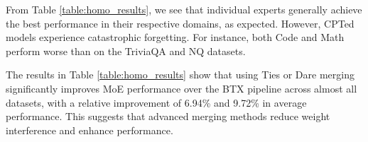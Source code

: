 
From Table \ref{table:homo_results}, we see that individual experts generally achieve the best performance in their respective domains, as expected. However, CPTed \llama models experience catastrophic forgetting. For instance, both Code and Math \llama perform worse than \llamab on the TriviaQA and NQ datasets.



The results in Table \ref{table:homo_results} show that using Ties or Dare merging significantly improves MoE performance over the BTX pipeline across almost all datasets, with a relative improvement of 6.94\% and 9.72\% in average performance. This suggests that advanced merging methods reduce weight interference and enhance performance.


